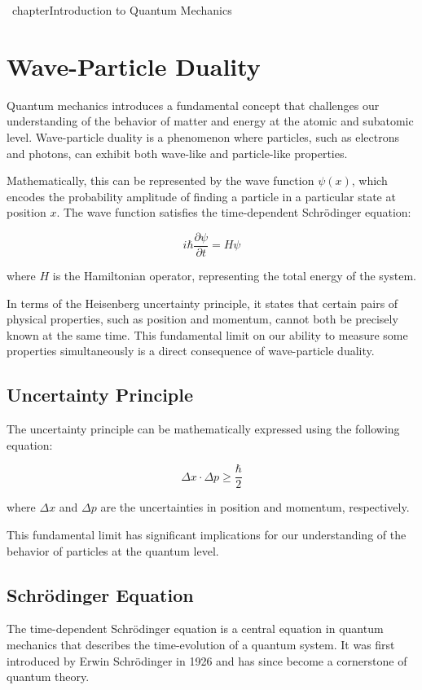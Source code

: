 \ chapter{Introduction to Quantum Mechanics}

\section*{Wave-Particle Duality}

Quantum mechanics introduces a fundamental concept that challenges our understanding of the behavior of matter and energy at the atomic and subatomic level. Wave-particle duality is a phenomenon where particles, such as electrons and photons, can exhibit both wave-like and particle-like properties.

Mathematically, this can be represented by the wave function $\psi(x)$, which encodes the probability amplitude of finding a particle in a particular state at position $x$. The wave function satisfies the time-dependent Schrödinger equation:

\[
i\hbar \frac{\partial \psi}{\partial t} = H \psi
\]

where $H$ is the Hamiltonian operator, representing the total energy of the system.

In terms of the Heisenberg uncertainty principle, it states that certain pairs of physical properties, such as position and momentum, cannot both be precisely known at the same time. This fundamental limit on our ability to measure some properties simultaneously is a direct consequence of wave-particle duality.

\subsection*{Uncertainty Principle}

The uncertainty principle can be mathematically expressed using the following equation:

\[
\Delta x \cdot \Delta p \geq \frac{\hbar}{2}
\]

where $\Delta x$ and $\Delta p$ are the uncertainties in position and momentum, respectively.

This fundamental limit has significant implications for our understanding of the behavior of particles at the quantum level.

\subsection*{Schrödinger Equation}

The time-dependent Schrödinger equation is a central equation in quantum mechanics that describes the time-evolution of a quantum system. It was first introduced by Erwin Schrödinger in 1926 and has since become a cornerstone of quantum theory.

